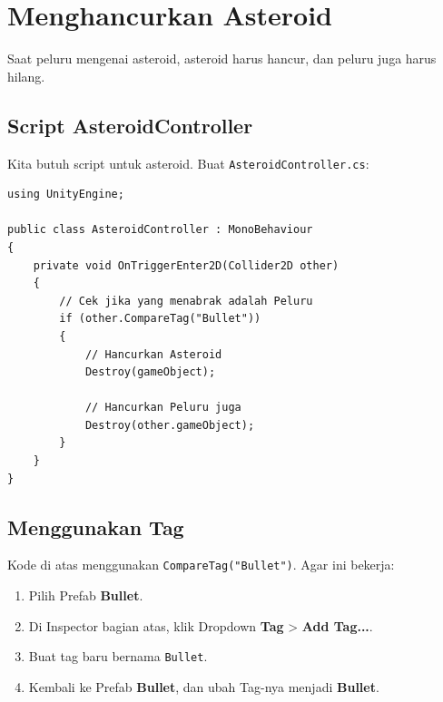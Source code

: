 
\section{Menghancurkan Asteroid}

Saat peluru mengenai asteroid, asteroid harus hancur, dan peluru juga harus hilang.

\subsection{Script AsteroidController}

Kita butuh script untuk asteroid. Buat \texttt{AsteroidController.cs}:

\begin{lstlisting}[language={[Sharp]C}, caption=AsteroidController.cs]
using UnityEngine;

public class AsteroidController : MonoBehaviour
{
    private void OnTriggerEnter2D(Collider2D other)
    {
        // Cek jika yang menabrak adalah Peluru
        if (other.CompareTag("Bullet"))
        {
            // Hancurkan Asteroid
            Destroy(gameObject);
            
            // Hancurkan Peluru juga
            Destroy(other.gameObject);
        }
    }
}
\end{lstlisting}

\subsection{Menggunakan Tag}
Kode di atas menggunakan \texttt{CompareTag("Bullet")}. Agar ini bekerja:
\begin{enumerate}
    \item Pilih Prefab \textbf{Bullet}.
    \item Di Inspector bagian atas, klik Dropdown \textbf{Tag} > \textbf{Add Tag...}.
    \item Buat tag baru bernama \texttt{Bullet}.
    \item Kembali ke Prefab \textbf{Bullet}, dan ubah Tag-nya menjadi \textbf{Bullet}.
\end{enumerate}
